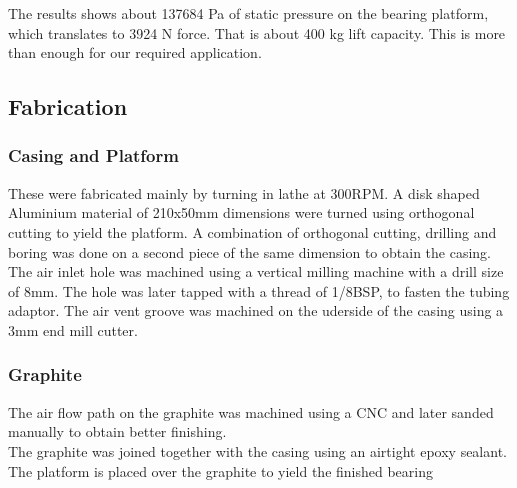 The results shows about 137684 Pa of static pressure on the bearing platform, which translates to 3924 N force. That is about 400 kg lift capacity. This is more than enough for our required application.

\subsection{Fabrication}

\subsubsection{Casing and Platform}

These were fabricated mainly by turning in lathe at 300RPM. A disk shaped Aluminium material of 210x50mm dimensions were turned using orthogonal cutting to yield the platform. A combination of orthogonal cutting, drilling and boring was done on a second piece of the same dimension to obtain the casing. The air inlet hole was machined using a vertical milling machine with a drill size of 8mm. The hole was later tapped with a thread of 1/8BSP, to fasten the tubing adaptor. The air vent groove was machined on the uderside of the casing using a 3mm end mill cutter.

\subsubsection{Graphite}
 
The air flow path on the graphite was machined using a CNC and later sanded manually to obtain better finishing.\\

The graphite was joined together with the casing using an airtight epoxy sealant. The platform is placed over the graphite to yield the finished bearing